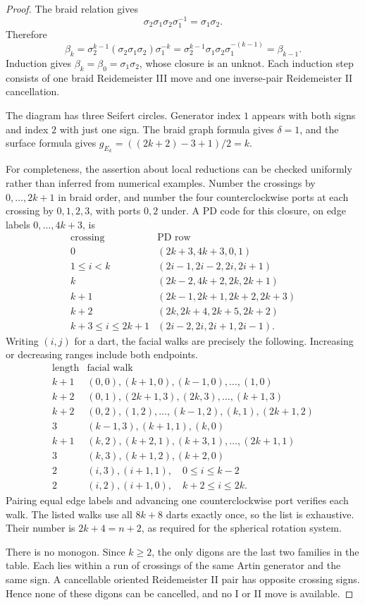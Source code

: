 \begin{proof}
The braid relation gives
\[
 \sigma_2\sigma_1\sigma_2\sigma_1^{-1}
   =\sigma_1\sigma_2.
\]
Therefore
\[
 \beta_k
 =\sigma_2^{k-1}(\sigma_2\sigma_1\sigma_2)
       \sigma_1^{-k}
 =\sigma_2^{k-1}\sigma_1\sigma_2\sigma_1^{-(k-1)}
 =\beta_{k-1}.
\]
Induction gives $\beta_k=\beta_0=\sigma_1\sigma_2$, whose closure
is an unknot.  Each induction step consists of one braid Reidemeister
III move and one inverse-pair Reidemeister II cancellation.

The diagram has three Seifert circles.  Generator index $1$ appears
with both signs and index $2$ with just one sign.  The braid graph
formula gives $\delta=1$, and the surface formula gives
$g_{E_k}=((2k+2)-3+1)/2=k$.

For completeness, the assertion about local reductions can be checked
uniformly rather than inferred from numerical examples.  Number the
crossings by $0,\ldots,2k+1$ in braid order, and number the four
counterclockwise ports at each crossing by $0,1,2,3$, with ports $0,2$
under.  A PD code for this closure, on edge labels $0,\ldots,4k+3$, is
\[
\begin{array}{c|l}
\text{crossing}&\text{PD row}\\\hline
0 &(2k+3,4k+3,0,1)\\
1\le i<k &(2i-1,2i-2,2i,2i+1)\\
k &(2k-2,4k+2,2k,2k+1)\\
k+1 &(2k-1,2k+1,2k+2,2k+3)\\
k+2 &(2k,2k+4,2k+5,2k+2)\\
k+3\le i\le2k+1 &(2i-2,2i,2i+1,2i-1).
\end{array}
\]
Writing $(i,j)$ for a dart, the facial walks are precisely the
following.  Increasing or decreasing ranges include both endpoints.
\[
\begin{array}{c|l}
\text{length}&\text{facial walk}\\\hline
k+1 &(0,0),(k+1,0),(k-1,0),\ldots,(1,0)\\
k+2 &(0,1),(2k+1,3),(2k,3),\ldots,(k+1,3)\\
k+2 &(0,2),(1,2),\ldots,(k-1,2),(k,1),(2k+1,2)\\
3 &(k-1,3),(k+1,1),(k,0)\\
k+1 &(k,2),(k+2,1),(k+3,1),\ldots,(2k+1,1)\\
3 &(k,3),(k+1,2),(k+2,0)\\
2 &(i,3),(i+1,1),\quad 0\le i\le k-2\\
2 &(i,2),(i+1,0),\quad k+2\le i\le2k.
\end{array}
\]
Pairing equal edge labels and advancing one counterclockwise port
verifies each walk.  The listed walks use all $8k+8$ darts exactly
once, so the list is exhaustive.  Their number is $2k+4=n+2$, as
required for the spherical rotation system.

There is no monogon.  Since $k\ge2$, the only digons are the last
two families in the table.  Each lies within a run of crossings of
the same Artin generator and the same sign.  A cancellable oriented
Reidemeister II pair has opposite crossing signs.  Hence none of
these digons can be cancelled, and no I or II move is available.
\end{proof}

